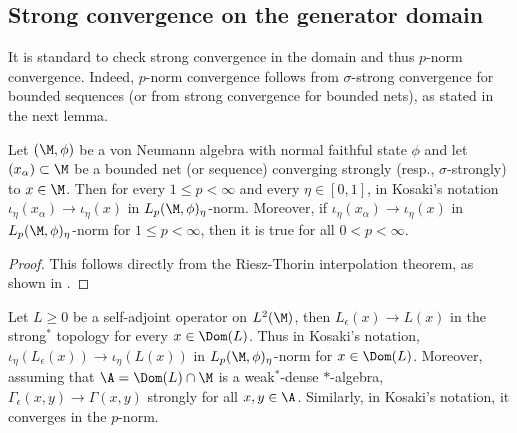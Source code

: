 \documentclass[sn-mathphys-num]{sn-jnl}
\begin{document}
\subsection{Strong convergence on the generator domain}
It is standard to check strong convergence in the domain and thus $p$-norm convergence. Indeed,
$p$-norm convergence follows from $\sigma$-strong convergence for bounded sequences
(or from strong convergence for bounded nets), as stated in the next lemma.
\begin{lemma}\label{lem:p-norm-convergence}
Let $(\M,\phi)$ be a von Neumann algebra with normal faithful state $\phi$ and
let $(x_\alpha) \subset \M$ be a bounded net (or sequence) converging strongly
(resp., $\sigma$-strongly) to $x \in \M$. Then for every $1 \leq p < \infty$ and every $\eta \in [0,1]$, in
Kosaki's notation $\iota_\eta(x_\alpha)\to \iota_\eta(x)$ in $L_p(\M,\phi)_\eta$-norm.
Moreover, if $\iota_\eta(x_\alpha)\to \iota_\eta(x)$ in $L_p(\M,\phi)_\eta$-norm for $1\le p<\infty$, then it is true for all $0<p<\infty$.

\end{lemma}
\begin{proof}
This follows directly from the Riesz-Thorin interpolation theorem, as shown in \cite[Lemma~2.3]{Junge2002Doobs}.
\end{proof}
\begin{proposition}\label{app:dom-strong}
Let $L\ge 0$ be a self-adjoint operator on $L^2(\M)$,
then $L_\epsilon (x)\to L(x)$ in the strong$^*$ topology for every
$x\in\Dom(L)$. Thus in Kosaki's notation, $\iota_\eta(L_\epsilon(x))\to \iota_\eta(L(x))$ in $L_p(\M,\phi)_\eta$-norm for $x\in\Dom(L)$.
Moreover, assuming that $\A= \Dom(L)\cap \M$ is a weak$^*$-dense $*$-algebra, $\Gamma_\epsilon(x,y)\to \Gamma(x,y)$ strongly for all $x,y\in\A$. Similarly, in Kosaki's notation, it converges in the $p$-norm.
\end{proposition}
\end{document}
